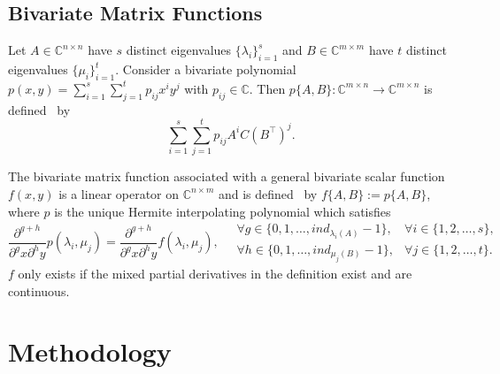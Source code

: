 \subsection{Bivariate Matrix Functions}
Let $A \in \mathbb{C}^{n \times n}$ have $s$ distinct eigenvalues $\{\lambda_i\}_{i=1}^{s}$
and $B \in \mathbb{C}^{m \times m}$ have $t$ distinct eigenvalues $\{\mu_i\}_{i=1}^{t}$.
Consider a bivariate polynomial $p(x, y) = \sum_{i=1}^{s} \sum_{j=1}^{t} p_{ij} x^i y^j$
with $p_{ij} \in \mathbb{C}$. Then $p\{A, B\}: \mathbb{C}^{m \times n} \to \mathbb{C}^{m \times n}$
is defined~\cite{kressner2014bivariate} by
\begin{equation}
    \sum_{i=1}^{s} \sum_{j=1}^{t} p_{ij} A^i C (B^\top)^j.
\end{equation}

The bivariate matrix function associated with a general bivariate scalar function
$f(x, y)$ is a linear operator on $\mathbb{C}^{n \times m}$ and is
defined~\cite{kressner2014bivariate} by $f\{A, B\} := p\{A, B\}$, where $p$ is the
unique Hermite interpolating polynomial which satisfies
\begin{equation*}
    \frac{\partial^{g+h}}{\partial^g x \partial^h y}p(\lambda_i, \mu_j)
    = \frac{\partial^{g+h}}{\partial^g x \partial^h y}f(\lambda_i, \mu_j),
    \quad
    \begin{matrix}
        \forall g \in \{0, 1, \dots, ind_{\lambda_i(A)}-1\},
        & \forall i \in \{1, 2, \dots, s\},
        \\
        \forall h \in \{0, 1, \dots, ind_{\mu_j(B)}-1\},
        & \forall j \in \{1, 2, \dots, t\}.
    \end{matrix}
\end{equation*}
$f$ only exists if the mixed partial derivatives in the definition exist and
are continuous.

\newpage
\section{Methodology}\label{sec:methods}

